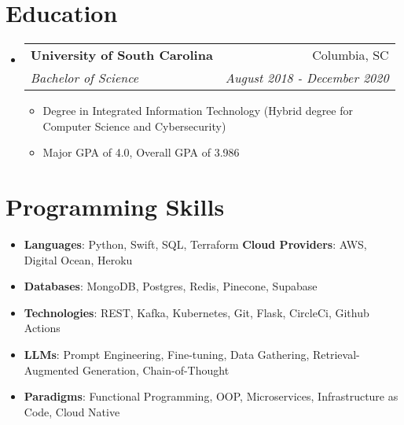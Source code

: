 \documentclass[a4paper]{article}
\makeatletter
\newcommand{\resumeSubheading}[4]{
  \vspace{-1pt}\item
    \begin{tabular*}{0.97\textwidth}[t]{l@{\extracolsep{\fill}}r}
      \textbf{#1} & #2 \\
      \textit{\small#3} & \textit{\small #4} \\
    \end{tabular*}\vspace{-5pt}
}
\newcommand{\resumeSubHeadingListStart}{\begin{itemize}[leftmargin=*]}
\newcommand{\resumeSubHeadingListEnd}{\end{itemize}}
\newcommand{\resumeItemListStart}{\begin{itemize}[leftmargin=0.4cm]}
\newcommand{\resumeItemListEnd}{\end{itemize}\vspace{-5pt}}
\makeatother
\begin{document}
 \section{Education}
  \resumeSubHeadingListStart
	\resumeSubheading
	{University of South Carolina}{Columbia, SC}
	{Bachelor of Science}{August 2018 - December 2020}
		\resumeItemListStart
			\item Degree in Integrated Information Technology (Hybrid degree for Computer Science and Cybersecurity)
			\item Major GPA of 4.0, Overall GPA of 3.986
		\resumeItemListEnd
  \resumeSubHeadingListEnd

 \section{Programming Skills}
  \resumeSubHeadingListStart
    \item{
      \textbf{Languages}: Python, Swift, SQL, Terraform
      \hfill
      \textbf{Cloud Providers}: AWS, Digital Ocean, Heroku
    }
    \item \textbf{Databases}: MongoDB, Postgres, Redis, Pinecone, Supabase
	\item \textbf{Technologies}: REST, Kafka, Kubernetes, Git, Flask, CircleCi, Github Actions
	\item \textbf{LLMs}: Prompt Engineering, Fine-tuning, Data Gathering, Retrieval-Augmented Generation, Chain-of-Thought 
	\item \textbf{Paradigms}: Functional Programming, OOP, Microservices, Infrastructure as Code, Cloud Native
  \resumeSubHeadingListEnd


\end{document}
